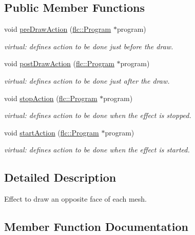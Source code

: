\subsection*{Public Member Functions}
\begin{DoxyCompactItemize}
\item 
void \hyperlink{classflw_1_1flf_1_1ClockwiseDrawEffect_ab6a8333c2a80dbc56190b73f3d06264e}{pre\+Draw\+Action} (\hyperlink{classflw_1_1flc_1_1Program}{flc\+::\+Program} $\ast$program)
\begin{DoxyCompactList}\small\item\em virtual\+: defines action to be done just before the draw. \end{DoxyCompactList}\item 
void \hyperlink{classflw_1_1flf_1_1ClockwiseDrawEffect_a7ca5b12de498014fd1b7320fbe749e4e}{post\+Draw\+Action} (\hyperlink{classflw_1_1flc_1_1Program}{flc\+::\+Program} $\ast$program)
\begin{DoxyCompactList}\small\item\em virtual\+: defines action to be done just after the draw. \end{DoxyCompactList}\item 
void \hyperlink{classflw_1_1flf_1_1ClockwiseDrawEffect_a538235e072e91bfa16e185a535547679}{stop\+Action} (\hyperlink{classflw_1_1flc_1_1Program}{flc\+::\+Program} $\ast$program)
\begin{DoxyCompactList}\small\item\em virtual\+: defines action to be done when the effect is stopped. \end{DoxyCompactList}\item 
void \hyperlink{classflw_1_1flf_1_1ClockwiseDrawEffect_a5d6c2f7e723f845f615572721f79a5a8}{start\+Action} (\hyperlink{classflw_1_1flc_1_1Program}{flc\+::\+Program} $\ast$program)
\begin{DoxyCompactList}\small\item\em virtual\+: defines action to be done when the effect is started. \end{DoxyCompactList}\end{DoxyCompactItemize}


\subsection{Detailed Description}
Effect to draw an opposite face of each mesh. 

\subsection{Member Function Documentation}
